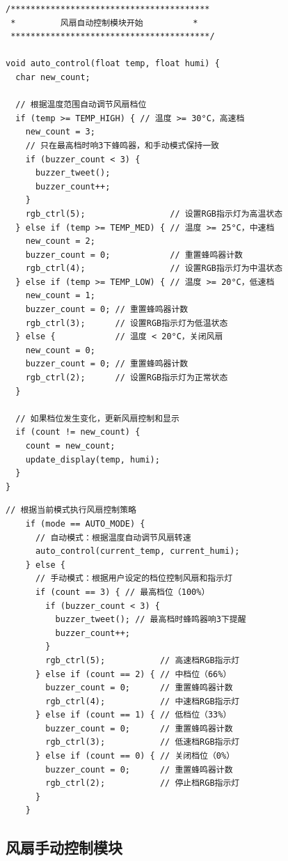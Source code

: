 \begin{lstlisting}[caption={自动调控逻辑}]
 /****************************************
 *         风扇自动控制模块开始          *
 ****************************************/

void auto_control(float temp, float humi) {
  char new_count;

  // 根据温度范围自动调节风扇档位
  if (temp >= TEMP_HIGH) { // 温度 >= 30°C，高速档
    new_count = 3;
    // 只在最高档时响3下蜂鸣器，和手动模式保持一致
    if (buzzer_count < 3) {
      buzzer_tweet();
      buzzer_count++;
    }
    rgb_ctrl(5);                 // 设置RGB指示灯为高温状态
  } else if (temp >= TEMP_MED) { // 温度 >= 25°C，中速档
    new_count = 2;
    buzzer_count = 0;            // 重置蜂鸣器计数
    rgb_ctrl(4);                 // 设置RGB指示灯为中温状态
  } else if (temp >= TEMP_LOW) { // 温度 >= 20°C，低速档
    new_count = 1;
    buzzer_count = 0; // 重置蜂鸣器计数
    rgb_ctrl(3);      // 设置RGB指示灯为低温状态
  } else {            // 温度 < 20°C，关闭风扇
    new_count = 0;
    buzzer_count = 0; // 重置蜂鸣器计数
    rgb_ctrl(2);      // 设置RGB指示灯为正常状态
  }

  // 如果档位发生变化，更新风扇控制和显示
  if (count != new_count) {
    count = new_count;
    update_display(temp, humi);
  }
}
\end{lstlisting}

\begin{lstlisting}[caption={模式匹配逻辑}]
    // 根据当前模式执行风扇控制策略
    if (mode == AUTO_MODE) {
      // 自动模式：根据温度自动调节风扇转速
      auto_control(current_temp, current_humi);
    } else {
      // 手动模式：根据用户设定的档位控制风扇和指示灯
      if (count == 3) { // 最高档位（100%）
        if (buzzer_count < 3) {
          buzzer_tweet(); // 最高档时蜂鸣器响3下提醒
          buzzer_count++;
        }
        rgb_ctrl(5);           // 高速档RGB指示灯
      } else if (count == 2) { // 中档位（66%）
        buzzer_count = 0;      // 重置蜂鸣器计数
        rgb_ctrl(4);           // 中速档RGB指示灯
      } else if (count == 1) { // 低档位（33%）
        buzzer_count = 0;      // 重置蜂鸣器计数
        rgb_ctrl(3);           // 低速档RGB指示灯
      } else if (count == 0) { // 关闭档位（0%）
        buzzer_count = 0;      // 重置蜂鸣器计数
        rgb_ctrl(2);           // 停止档RGB指示灯
      }
    }
\end{lstlisting}

\subsection{风扇手动控制模块}


